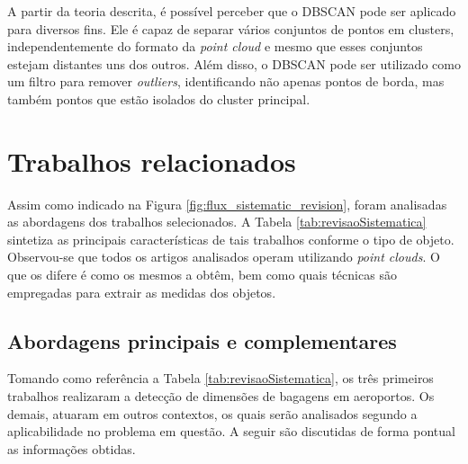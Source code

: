     
    A partir da teoria descrita, é possível perceber que o DBSCAN pode ser aplicado para diversos fins. Ele é capaz de separar vários conjuntos de pontos em clusters, independentemente do formato da \textit{point cloud} e mesmo que esses conjuntos estejam distantes uns dos outros. Além disso, o DBSCAN pode ser utilizado como um filtro para remover \textit{outliers}, identificando não apenas pontos de borda, mas também pontos que estão isolados do cluster principal.
    

\section{Trabalhos relacionados}
\label{sec_Trabalhos relacionados}

    Assim como indicado na Figura \ref{fig:flux_sistematic_revision}, foram analisadas as abordagens dos trabalhos selecionados. A Tabela \ref{tab:revisaoSistematica} sintetiza as principais características de tais trabalhos conforme o tipo de objeto. Observou-se que todos os artigos analisados operam utilizando \textit{point clouds}. O que os difere é como os mesmos a obtêm, bem como quais técnicas são empregadas para extrair as medidas dos objetos.





\subsection{Abordagens principais e complementares}
\label{subsec_Abordagens principais e complementares}

    Tomando como referência a Tabela \ref{tab:revisaoSistematica}, os três primeiros trabalhos realizaram a detecção de dimensões de bagagens em aeroportos. Os demais, atuaram em outros contextos, os quais serão analisados segundo a aplicabilidade no problema em questão. A seguir são discutidas de forma pontual as informações obtidas.



